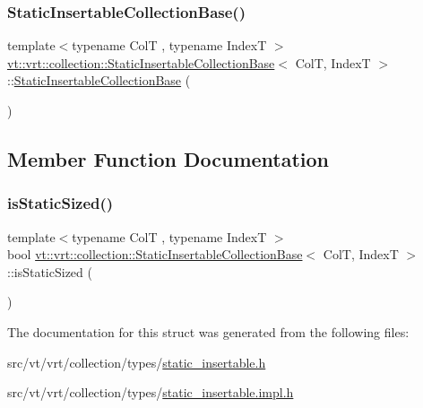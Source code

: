 \subsubsection{\texorpdfstring{Static\+Insertable\+Collection\+Base()}{StaticInsertableCollectionBase()}\hspace{0.1cm}{\footnotesize\ttfamily [2/2]}}
{\footnotesize\ttfamily template$<$typename ColT , typename IndexT $>$ \\
\hyperlink{structvt_1_1vrt_1_1collection_1_1_static_insertable_collection_base}{vt\+::vrt\+::collection\+::\+Static\+Insertable\+Collection\+Base}$<$ ColT, IndexT $>$\+::\hyperlink{structvt_1_1vrt_1_1collection_1_1_static_insertable_collection_base}{Static\+Insertable\+Collection\+Base} (\begin{DoxyParamCaption}{ }\end{DoxyParamCaption})}



\subsection{Member Function Documentation}
\mbox{\label{structvt_1_1vrt_1_1collection_1_1_static_insertable_collection_base_aa6176de291ff3080623c88993f2fbd4d}} 
\subsubsection{\texorpdfstring{is\+Static\+Sized()}{isStaticSized()}}
{\footnotesize\ttfamily template$<$typename ColT , typename IndexT $>$ \\
bool \hyperlink{structvt_1_1vrt_1_1collection_1_1_static_insertable_collection_base}{vt\+::vrt\+::collection\+::\+Static\+Insertable\+Collection\+Base}$<$ ColT, IndexT $>$\+::is\+Static\+Sized (\begin{DoxyParamCaption}{ }\end{DoxyParamCaption})\hspace{0.3cm}{\ttfamily [static]}}



The documentation for this struct was generated from the following files\+:\begin{DoxyCompactItemize}
\item 
src/vt/vrt/collection/types/\hyperlink{static__insertable_8h}{static\+\_\+insertable.\+h}\item 
src/vt/vrt/collection/types/\hyperlink{static__insertable_8impl_8h}{static\+\_\+insertable.\+impl.\+h}\end{DoxyCompactItemize}
